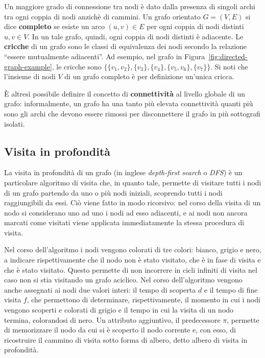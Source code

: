 Un maggiore grado di connessione tra nodi \`e dato dalla presenza di singoli archi tra ogni coppia di nodi anzich\`e
di cammini. \newline
Un grafo orientato $G = (V, E)$ si dice \textbf{completo} se esiste un arco $(u, v) \in E$ per ogni coppia di nodi
distinti $u, v \in V$.
In un tale grafo, quindi, ogni coppia di nodi distinti \`e adiacente. \newline
Le \textbf{cricche} di un grafo sono le classi di equivalenza dei nodi secondo la relazione
``essere mutualmente adiacenti''.
Ad esempio, nel grafo in Figura~\ref{fig:directed-graph-example}, le cricche sono
$\{\{v_1, v_2\}, \{v_3\}, \{v_4\}, \{v_5, v_6\}, \{v_7\}\}$. \newline
Si noti che l'insieme di nodi $V$ di un grafo completo \`e per definizione un'unica cricca. \newline

\`E altresì possibile definire il concetto di \textbf{connettività} al livello globale di un grafo: informalmente,
un grafo ha una tanto più elevata connettività quanti più sono gli archi che devono essere rimossi per disconnettere
il grafo in più sottografi isolati.

\subsection{Visita in profondit\`a}
La visita in profondit\`a di un grafo (in inglese \textit{depth-first search} o \textit{DFS}) \`e un particolare
algoritmo di visita che, in quanto tale, permette di visitare tutti i nodi di un grafo partendo da uno o più nodi
iniziali, scoprendo tutti i nodi raggiungibili da essi.
Ci\`o viene fatto in modo ricorsivo: nel corso della visita di un nodo si considerano uno ad uno i nodi ad esso
adiacenti, e ai nodi non ancora marcati come visitati viene applicata immediatamente la stessa procedura di visita.
\newpage




Nel corso dell'algoritmo i nodi vengono colorati di tre colori: bianco, grigio e nero, a indicare rispettivamente
che il nodo non \`e stato visitato, che \`e in fase di visita e che \`e stato visitato.
Questo permette di non incorrere in cicli infiniti di visita nel caso non si stia visitando un grafo aciclico.
Nel corso dell'algoritmo vengono anche assegnati ai nodi due valori interi: il tempo di scoperta $d$ e il tempo di
fine visita $f$, che permettono di determinare, rispettivamente, il momento in cui i nodi vengono scoperti e colorati
di grigio e il tempo in cui la visita di un nodo termina, colorandosi di nero.
Un attributo aggiuntivo, il predecessore $\pi$, permette di memorizzare il nodo da cui si \`e scoperto il nodo
corrente e, con esso, di ricostruire il cammino di visita sotto forma di albero, detto albero di visita in profondit\`a.

